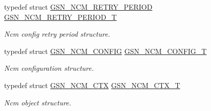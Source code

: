 \begin{DoxyCompactItemize}
typedef struct \hyperlink{a00162}{GSN\_\-NCM\_\-RETRY\_\-PERIOD} \hyperlink{a00688_ga85c994a3952734087a59e5157a99d8c5}{GSN\_\-NCM\_\-RETRY\_\-PERIOD\_\-T}
\begin{DoxyCompactList}\small\item\em Ncm config retry period structure. \end{DoxyCompactList}\item 
typedef struct \hyperlink{a00157}{GSN\_\-NCM\_\-CONFIG} \hyperlink{a00688_ga9095c8feaa607f7d67a5ff8db069ebf2}{GSN\_\-NCM\_\-CONFIG\_\-T}
\begin{DoxyCompactList}\small\item\em Ncm configuration structure. \end{DoxyCompactList}\item 
typedef struct \hyperlink{a00158}{GSN\_\-NCM\_\-CTX} \hyperlink{a00688_ga102caaf372e99d011f89da1602cdc514}{GSN\_\-NCM\_\-CTX\_\-T}
\begin{DoxyCompactList}\small\item\em Ncm object structure. \end{DoxyCompactList}\end{DoxyCompactItemize}
